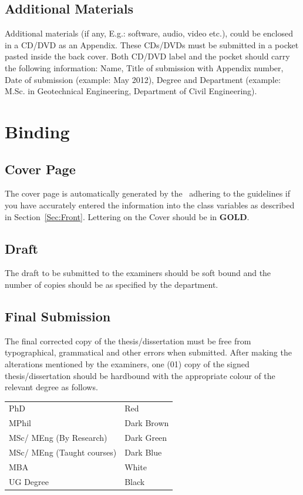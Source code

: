 \documentclass[12pt]{uomthesis}
\begin{document}
\subsection{Additional Materials}
Additional materials (if any, E.g.: software, audio, video etc.), could be enclosed in a CD/DVD as an Appendix. These CDs/DVDs must be submitted in a pocket pasted inside the back cover. Both CD/DVD label and the pocket should carry the following information: Name, Title of submission with Appendix number, Date of submission (example: May 2012), Degree and Department (example: M.Sc. in Geotechnical Engineering, Department of Civil Engineering).

\section{Binding}
\subsection{Cover Page}
The cover page is automatically generated by the~\TheClass{} adhering to the \UoM{} guidelines if you have accurately entered the information into the class variables as described in Section~\ref{Sec:Front}. Lettering on the Cover should be in \textbf{GOLD}.

\subsection{Draft}
The draft to be submitted to the examiners should be soft bound and the number of copies should be as specified by the department.

\subsection{Final Submission}
The final corrected copy of the thesis/dissertation must be free from typographical, grammatical and other errors when submitted. After making the alterations mentioned by the examiners, one (01) copy of the signed thesis/dissertation should be hardbound with the appropriate colour of the relevant degree as follows.

\begin{table}[!htb]
    \centering
\begin{tabular}{ll}
PhD & Red\\
MPhil & Dark Brown\\
MSc/ MEng (By Research) & Dark Green\\
MSc/ MEng (Taught courses) & Dark Blue\\
MBA & White\\
UG Degree & Black\\
\end{tabular}
\end{table}
\FloatBarrier
\end{document}

